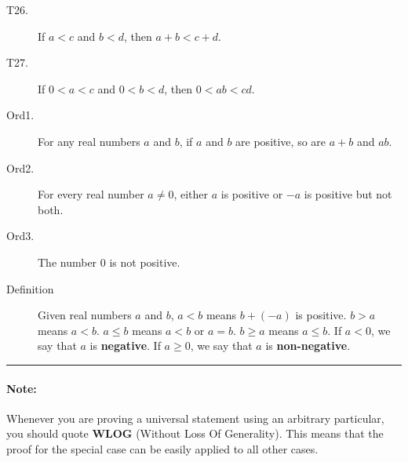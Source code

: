 \documentclass{article}
\begin{document}
\begin{multicols*}{2}
\begin{description}
        \item[T26.]If $a<c$ and $b<d$, then $a+b<c+d$.
        \item[T27.]If $0<a<c$ and $0<b<d$, then $0<ab<cd$.
        \item[Ord1.]For any real numbers $a$ and $b$, if $a$ and $b$ are positive, so are $a+b$ and $ab$. 
        \item[Ord2.]For every real number $a\neq 0$, either $a$ is positive or $-a$ is positive but not both.
        \item[Ord3.]The number 0 is not positive. 
        \item[Definition]Given real numbers $a$ and $b$, $a < b$ means $b + (-a)$ is positive. $b > a$ means $a < b$. $a\leq b$ means $a < b$ or $a=b$. $b\geq a$ means $a\leq b$. If $a < 0$, we say that $a$ is \textbf{negative}. If $a \geq 0$, we say that $a$ is \textbf{non-negative}.
    \end{description}
    \hrule

    \paragraph{Note:} Whenever you are proving a universal statement using an arbitrary particular, you should quote \textbf{WLOG} (Without Loss Of Generality). This means that the proof for the special case can be easily applied to all other cases. 
\end{multicols*}


\newpage
\end{document}
